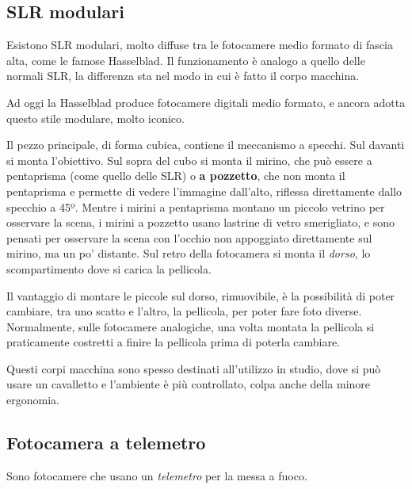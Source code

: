 \subsection{SLR modulari} \label{subsec:slrmodulari}
Esistono SLR modulari, molto diffuse tra le fotocamere medio formato di fascia alta, come le famose Hasselblad.
Il funzionamento è analogo a quello delle normali SLR, la differenza sta nel modo in cui è fatto il corpo macchina.

Ad oggi la Hasselblad produce fotocamere digitali medio formato, e ancora adotta questo stile modulare, molto iconico.

Il pezzo principale, di forma cubica, contiene il meccanismo a specchi. Sul davanti si monta l'obiettivo. Sul sopra del cubo si monta il mirino, che può essere a pentaprisma (come quello delle SLR) o \textbf{a pozzetto}, che non monta il pentaprisma e permette di vedere l'immagine dall'alto, riflessa direttamente dallo specchio a 45º. Mentre i mirini a pentaprisma montano un piccolo vetrino per osservare la scena, i mirini a pozzetto usano lastrine di vetro smerigliato, e sono pensati per osservare la scena con l'occhio non appoggiato direttamente sul mirino, ma un po' distante.
Sul retro della fotocamera si monta il \textit{dorso}, lo scompartimento dove si carica la pellicola.

Il vantaggio di montare le piccole sul dorso, rimuovibile, è la possibilità di poter cambiare, tra uno scatto e l'altro, la pellicola, per poter fare foto diverse.
Normalmente, sulle fotocamere analogiche, una volta montata la pellicola si praticamente costretti a finire la pellicola prima di poterla cambiare.

Questi corpi macchina sono spesso destinati all'utilizzo in studio, dove si può usare un cavalletto e l'ambiente è più controllato, colpa anche della minore ergonomia.

%


\subsection{Fotocamera a telemetro} \label{subsec:telemetro}
Sono fotocamere che usano un \textit{telemetro} per la messa a fuoco.

